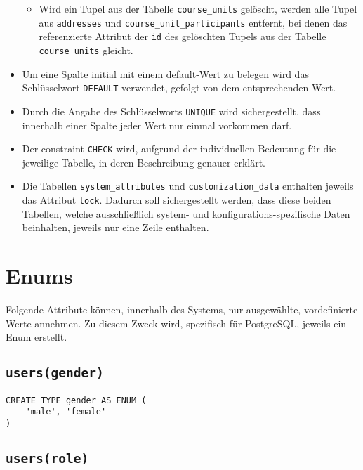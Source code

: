 \begin{itemize}
\begin{itemize}
\item Wird ein Tupel aus der Tabelle \texttt{course\_units} gelöscht, werden alle Tupel aus \texttt{addresses} und \texttt{course\_unit\_participants} entfernt, bei denen das referenzierte Attribut der \texttt{id} des gelöschten Tupels aus der Tabelle \texttt{course\_units} gleicht.
\end{itemize}

\item Um eine Spalte initial mit einem default-Wert zu belegen wird das Schlüsselwort \texttt{DEFAULT} verwendet, gefolgt von dem entsprechenden Wert.

\item Durch die Angabe des Schlüsselworts \texttt{UNIQUE} wird sichergestellt, dass innerhalb einer Spalte jeder Wert nur einmal vorkommen darf.

\item Der constraint \texttt{CHECK} wird, aufgrund der individuellen Bedeutung für die jeweilige Tabelle, in deren Beschreibung genauer erklärt.

\item Die Tabellen \texttt{system\_attributes} und \texttt{customization\_data} enthalten jeweils das Attribut \texttt{lock}. Dadurch soll sichergestellt werden, dass diese beiden Tabellen, welche ausschließlich system- und konfigurations-spezifische Daten beinhalten, jeweils nur eine Zeile enthalten.

\end{itemize}

\section{Enums}
Folgende Attribute können, innerhalb des Systems, nur ausgewählte, vordefinierte Werte annehmen. Zu diesem Zweck wird, spezifisch für PostgreSQL, jeweils ein Enum erstellt.

\subsection{\texttt{users(gender)}}

\begin{verbatim}
CREATE TYPE gender AS ENUM (
    'male', 'female'
)
\end{verbatim}

\subsection{\texttt{users(role)}}

